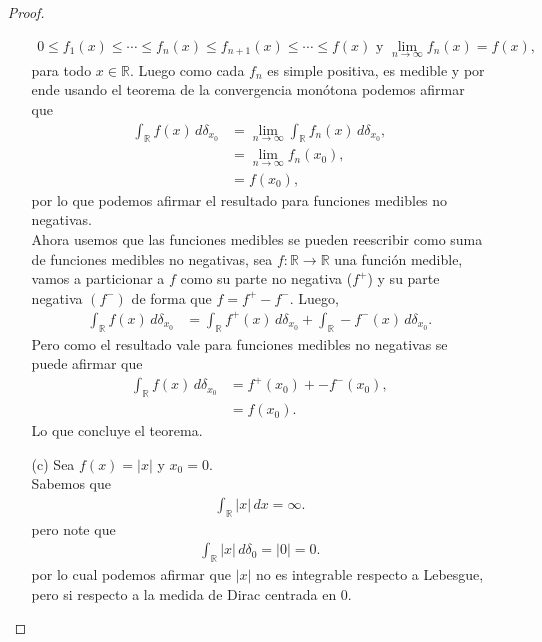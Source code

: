 \begin{enumerate}
\begin{proof}
\begin{enumerate}
      \begin{align*}
        0\leq f_{1}(x)\leq\cdots\leq f_n(x)\leq f_{n+1}(x)\leq \cdots \leq f(x) \text{ y }  \lim_{n \to \infty} f_n(x) = f(x),  
      \end{align*}
      para todo $x \in \mathbb{R}$. Luego como cada $f_{n}$ es simple positiva, es medible y por ende usando el teorema de la convergencia monótona podemos afirmar que
      \begin{align*}
        \int_{\mathbb{R}} f(x) \, d\delta_{x_0} &= \lim_{n \to \infty} \int_{\mathbb{R}} f_n(x) \, d\delta_{x_0},\\
        &= \lim_{n \to \infty} f_n(x_0),\\
        &= f(x_0),       
      \end{align*}
      por lo que podemos afirmar el resultado para funciones medibles no negativas.\\
      Ahora usemos que las funciones medibles se pueden reescribir como suma de funciones medibles no negativas, sea $f: \mathbb{R} \to \mathbb{R}$ una función medible, vamos a particionar a $f$ como su parte no negativa ($f^{+}$) y su parte negativa $(f^{-})$ de forma que $f = f^+ - f^-$. Luego,
      \begin{align*}
        \int_{\mathbb{R}} f(x) \, d\delta_{x_0} &= \int_{\mathbb{R}} f^+(x) \, d\delta_{x_0} + \int_{\mathbb{R}} -f^-(x) \, d\delta_{x_0}.       
      \end{align*}
      Pero como el resultado vale para funciones medibles no negativas se puede afirmar que
      \begin{align*}
        \int_{\mathbb{R}} f(x) \, d\delta_{x_0} &= f^+(x_0) + -f^-(x_0),\\
        &= f(x_0).       
      \end{align*}
      Lo que concluye el teorema.
     \item[(c)] Sea $f(x)=|x|$ y $x_0=0$.\\
      Sabemos que
      \begin{align*}
        \int_{\mathbb{R}}|x|\, dx=\infty.
      \end{align*}
      pero note que
      \begin{align*}
        \int_{\mathbb{R}}|x|\, d\delta_{0}=|0|=0.
      \end{align*}
      por lo cual podemos afirmar que $|x|$ no es integrable respecto a Lebesgue, pero si respecto a la medida de Dirac centrada en $0$. 
  \end{enumerate} 
\end{proof}

\end{enumerate}
